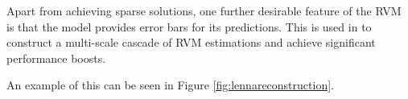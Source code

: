 Apart from achieving sparse solutions, one further desirable feature of the RVM is that the model provides error bars for its predictions.
This is used in \cite{pilikos2014} to construct a multi-scale cascade of RVM estimations and achieve significant performance boosts.

An example of this can be seen in Figure \ref{fig:lennareconstruction}.

